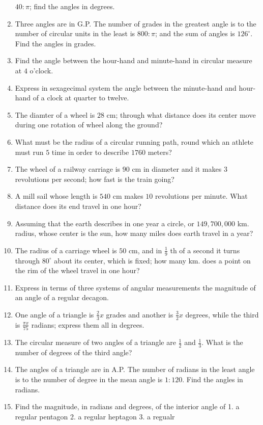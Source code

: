 \begin{enumerate}[resume]
$40:\pi$; find the angles in degrees.
\item Three angles are in G.P. The number of grades in the greatest angle is to the number of circular units in the least is
    $800:\pi$; and the sum of angles is $126^\circ$. Find the angles in grades.
\item Find the angle between the hour-hand and minute-hand in circular measure at $4$ o'clock.
\item Express in sexagecimal system the angle between the minute-hand and hour-hand of a clock at quarter to twelve.
\item The diamter of a wheel is $28$ cm; through what distance does its center move during one rotation of wheel along the
    ground?
\item What must be the radius of a circular running path, round which an athlete must run $5$ time in order to describe
    $1760$ meters?
\item The wheel of a railway carriage is $90$ cm in diameter and it makes $3$ revolutions per second; how fast is the
    train going?
\item A mill sail whose length is $540$ cm makes $10$ revolutions per minute. What distance does its end travel in one
    hour?
\item Assuming that the earth describes in one year a circle, or $149,700,000$ km. radius, whose center is the sun, how many
    miles does earth travel in a year?
\item The radius of a carriage wheel is $50$ cm, and in $\frac{1}{9}$ th of a second it turns through $80^\circ$
    about its center, which is fixed; how many km. does a point on the rim of the wheel travel in one hour?
\item Express in terms of three systems of angular measurements the magnitude of an angle of a regular decagon.
\item One angle of a triangle is $\frac{2}{3}x$ grades and another is $\frac{3}{2}x$ degrees, while the third is
    $\frac{\pi x}{75}$ radians; express them all in degrees.
\item The circular measure of two angles of a triangle are $\frac{1}{2}$ and $\frac{1}{3}$. What is the number of degrees
    of the third angle?
\item The angles of a triangle are in A.P. The number of radians in the least angle is to the number of degree in the mean angle is
    $1:120$. Find the angles in radians.
\item Find the magnitude, in radians and degrees, of the interior angle of 1. a regular pentagon 2. a regular heptagon 3. a regualr

\end{enumerate}
